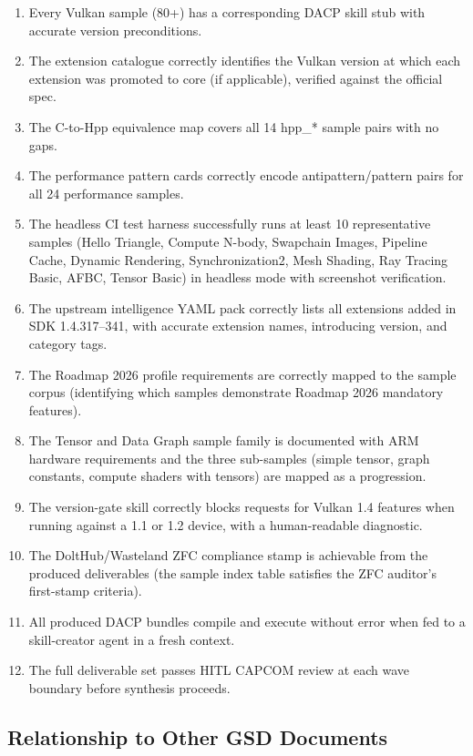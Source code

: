 \documentclass[11pt,letterpaper]{article}
\begin{document}
\begin{enumerate}
  \item Every Vulkan sample (80+) has a corresponding DACP skill stub with accurate version preconditions.
  \item The extension catalogue correctly identifies the Vulkan version at which each extension was promoted to core (if applicable), verified against the official spec.
  \item The C-to-Hpp equivalence map covers all 14 hpp\_* sample pairs with no gaps.
  \item The performance pattern cards correctly encode antipattern/pattern pairs for all 24 performance samples.
  \item The headless CI test harness successfully runs at least 10 representative samples (Hello Triangle, Compute N-body, Swapchain Images, Pipeline Cache, Dynamic Rendering, Synchronization2, Mesh Shading, Ray Tracing Basic, AFBC, Tensor Basic) in headless mode with screenshot verification.
  \item The upstream intelligence YAML pack correctly lists all extensions added in SDK 1.4.317--341, with accurate extension names, introducing version, and category tags.
  \item The Roadmap 2026 profile requirements are correctly mapped to the sample corpus (identifying which samples demonstrate Roadmap 2026 mandatory features).
  \item The Tensor and Data Graph sample family is documented with ARM hardware requirements and the three sub-samples (simple tensor, graph constants, compute shaders with tensors) are mapped as a progression.
  \item The version-gate skill correctly blocks requests for Vulkan 1.4 features when running against a 1.1 or 1.2 device, with a human-readable diagnostic.
  \item The DoltHub/Wasteland ZFC compliance stamp is achievable from the produced deliverables (the sample index table satisfies the ZFC auditor's first-stamp criteria).
  \item All produced DACP bundles compile and execute without error when fed to a skill-creator agent in a fresh context.
  \item The full deliverable set passes HITL CAPCOM review at each wave boundary before synthesis proceeds.
\end{enumerate}

\subsection{Relationship to Other GSD Documents}
\end{document}

